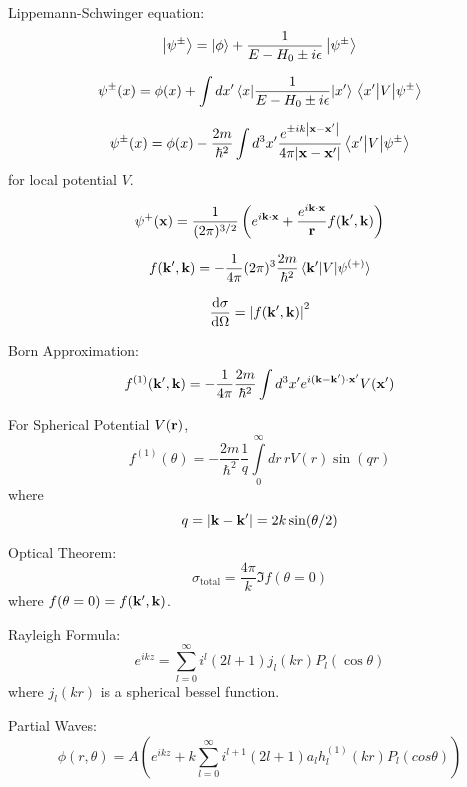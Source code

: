 \documentclass[a4paper, twocolumn]{article}
\begin{document}
Lippemann-Schwinger equation:
\begin{equation*}
    \ket{\psi^{\pm}} = \ket{\phi} + \frac{1}{E - H_0 \pm i \epsilon} \ket{\psi^{\pm}}
\end{equation*}

\begin{equation*}
    \psi^{\pm}(x) = \phi(x) + \int dx^{\prime} \mel{x}{\frac{1}{E - H_0 \pm i \epsilon}}{x^\prime} \mel{x^\prime}{V}{\psi^{\pm}}
\end{equation*}


\begin{equation*}
    \psi^{\pm}(x) = \phi(x) - \frac{2m}{\hbar^{2}} \int d^3 x^{\prime} \frac{ e^{\pm ik \abs{\vb{x} - \vb{x^\prime}}} }{ 4\pi \abs{\vb{x} - \vb{x^\prime}}} \mel{x^\prime}{V}{\psi^{\pm}}
\end{equation*}
for local potential $V$.

\begin{equation*}
    \psi^{+}(\vb{x}) = \frac{1}{(2\pi)^{3/2}} \left( e^{i \vb{k} \cdot \vb{x}} + \frac{ e^{i \vb{k} \cdot \vb{x}} }{\vb{r}} f(\vb{k}^\prime, \vb{k}) \right)
\end{equation*}

\begin{equation*}
    f(\vb{k}^{\prime}, \vb{k}) = - \frac{1}{4 \pi} (2 \pi)^{3} \frac{2m}{\hbar^2} \mel*{\vb{k}^{\prime}}{V}{\psi^{(+)}}
\end{equation*}

\begin{equation*}
    \dv{\sigma}{\Omega} = \abs{ f(\vb{k}^{\prime}, \vb{k}) }^2
\end{equation*}

Born Approximation:
\begin{equation*}
    f^{(1)}(\vb{k}^{\prime}, \vb{k}) = - \frac{1}{4 \pi} \frac{2m}{\hbar^2} \int d^3 x^{\prime} e^{ i(\vb{k} - \vb{k}^\prime) \cdot \vb{x}^\prime } V(\vb{x}^\prime)
\end{equation*}

For Spherical Potential $V(\vb{r})$,
\begin{equation*}
    f^{(1)}(\theta) = - \frac{2m}{\hbar^2} \frac{1}{q} \int\limits_{0}^{\infty} dr\, r V(r) \sin(q r)
\end{equation*}
where $$q=\abs{ \vb{k} - \vb{k}^\prime } = 2 k \sin(\theta/2)$$

Optical Theorem:
\begin{equation*}
    \sigma_{\mathrm{total}} = \frac{4 \pi}{k} \Im f(\theta=0)
\end{equation*}
where $f(\theta=0) = f(\vb{k}^{\prime}, \vb{k})$.

Rayleigh Formula:
\begin{equation*}
    e^{ikz} = \sum\limits_{l=0}^{\infty} i^{l} (2l+1) j_l(kr) P_{l}(\cos \theta)
\end{equation*}
where $j_l(kr)$ is a spherical bessel function.

Partial Waves:
\begin{equation*}
    \phi(r, \theta) = A \left( e^{ikz} + k \sum\limits_{l=0}^{\infty} i^{l+1} (2l+1) a_l h_l^{(1)}(kr) P_{l}(cos\theta) \right)
\end{equation*}
\end{document}
